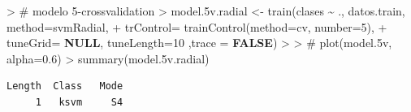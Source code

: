 \documentclass[
]{article}
\newenvironment{Shaded}{\begin{snugshade}}{\end{snugshade}}
\newcommand{\AttributeTok}[1]{\textcolor[rgb]{0.80,0.80,0.80}{#1}}
\newcommand{\CommentTok}[1]{\textcolor[rgb]{0.50,0.62,0.50}{#1}}
\newcommand{\ConstantTok}[1]{\textcolor[rgb]{0.86,0.64,0.64}{\textbf{#1}}}
\newcommand{\DecValTok}[1]{\textcolor[rgb]{0.86,0.86,0.80}{#1}}
\newcommand{\ErrorTok}[1]{\textcolor[rgb]{0.76,0.75,0.62}{#1}}
\newcommand{\FloatTok}[1]{\textcolor[rgb]{0.75,0.75,0.82}{#1}}
\newcommand{\FunctionTok}[1]{\textcolor[rgb]{0.94,0.94,0.56}{#1}}
\newcommand{\NormalTok}[1]{\textcolor[rgb]{0.80,0.80,0.80}{#1}}
\newcommand{\OtherTok}[1]{\textcolor[rgb]{0.94,0.94,0.56}{#1}}
\newcommand{\SpecialCharTok}[1]{\textcolor[rgb]{0.86,0.64,0.64}{#1}}
\newcommand{\StringTok}[1]{\textcolor[rgb]{0.80,0.58,0.58}{#1}}
\begin{document}
\begin{Shaded}
\begin{Highlighting}[]
\SpecialCharTok{\textgreater{}} \CommentTok{\# modelo 5{-}crossvalidation }
\ErrorTok{\textgreater{}}\NormalTok{ model}\FloatTok{.5}\NormalTok{v.radial }\OtherTok{\textless{}{-}} \FunctionTok{train}\NormalTok{(clases }\SpecialCharTok{\textasciitilde{}}\NormalTok{ ., datos.train, }\AttributeTok{method=}\StringTok{\textquotesingle{}svmRadial\textquotesingle{}}\NormalTok{, }
\SpecialCharTok{+}                \AttributeTok{trControl=} \FunctionTok{trainControl}\NormalTok{(}\AttributeTok{method=}\StringTok{\textquotesingle{}cv\textquotesingle{}}\NormalTok{, }\AttributeTok{number=}\DecValTok{5}\NormalTok{), }
\SpecialCharTok{+}                \AttributeTok{tuneGrid=} \ConstantTok{NULL}\NormalTok{, }\AttributeTok{tuneLength=}\DecValTok{10}\NormalTok{ ,}\AttributeTok{trace =} \ConstantTok{FALSE}\NormalTok{)}
\SpecialCharTok{\textgreater{}} 
\ErrorTok{\textgreater{}} \CommentTok{\# plot(model.5v, alpha=0.6)}
\ErrorTok{\textgreater{}} \FunctionTok{summary}\NormalTok{(model}\FloatTok{.5}\NormalTok{v.radial)}
\end{Highlighting}
\end{Shaded}

\begin{verbatim}
Length  Class   Mode 
     1   ksvm     S4 
\end{verbatim}

\begin{Shaded}
\end{Shaded}
\end{document}
